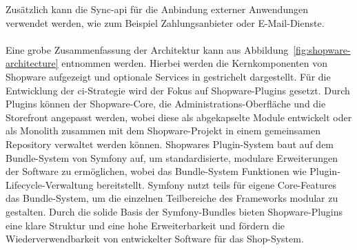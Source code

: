 Zusätzlich kann die Sync-\acrshort{api} für die Anbindung externer Anwendungen verwendet werden, wie zum Beispiel
Zahlungsanbieter oder E-Mail-Dienste.
\\\\
Eine grobe Zusammenfassung der Architektur kann aus Abbildung\ \ref{fig:shopware-architecture} entnommen werden.
Hierbei werden die Kernkomponenten von Shopware aufgezeigt und optionale Services in gestrichelt dargestellt.
Für die Entwicklung der \acrshort{ci}-Strategie wird der Fokus auf Shopware-Plugins gesetzt.
Durch Plugins können der Shopware-Core, die Administrations-Oberfläche und die Storefront angepasst werden, wobei diese
als abgekapselte Module entwickelt oder als Monolith zusammen mit dem Shopware-Projekt in einem gemeinsamen Repository
verwaltet werden können.
Shopwares Plugin-System baut auf dem Bundle-System von Symfony auf, um standardisierte, modulare Erweiterungen der
Software zu ermöglichen, wobei das Bundle-System Funktionen wie Plugin-Lifecycle-Verwaltung bereitstellt.
Symfony nutzt teils für eigene Core-Features das Bundle-System, um die einzelnen Teilbereiche des Frameworks modular zu
gestalten.
Durch die solide Basis der Symfony-Bundles bieten Shopware-Plugins eine klare Struktur und eine hohe Erweiterbarkeit
und fördern die Wiederverwendbarkeit von entwickelter Software für das Shop-System.

\clearpage
